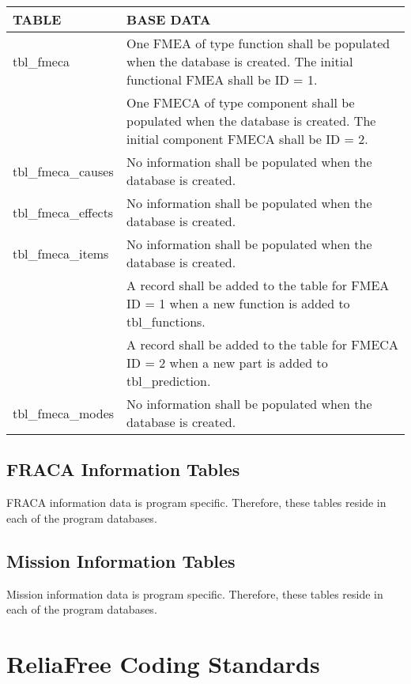 \documentclass[11pt, 12pt, twoside, onecolumn]{article}
\begin{document}
    \begin{landscape}
    \begin{longtable}{ll}
    TABLE & BASE DATA \\
    \hline
    tbl\_fmeca & One FMEA of type function shall be populated when the database is created. The initial functional FMEA shall be ID = 1. \\
    & One FMECA of type component shall be populated when the database is created.  The initial component FMECA shall be ID = 2. \\
    tbl\_fmeca\_causes & No information shall be populated when the database is created. \\
    tbl\_fmeca\_effects & No information shall be populated when the database is created. \\
    tbl\_fmeca\_items & No information shall be populated when the database is created. \\
    & A record shall be added to the table for FMEA ID = 1 when a new function is added to tbl\_functions. \\
    & A record shall be added to the table for FMECA ID = 2 when a new part is added to tbl\_prediction. \\
    tbl\_fmeca\_modes & No information shall be populated when the database is created. \\
    \hline
    \end{longtable}
    \end{landscape}

\subsection{\bf \large FRACA Information Tables}

\noindent FRACA information data is program specific.  Therefore, these tables reside in each of the program databases.

\subsection{\bf \large Mission Information Tables}

\noindent Mission information data is program specific.  Therefore, these tables reside in each of the program databases.

\section{\bf \Large ReliaFree Coding Standards}
\end{document}
